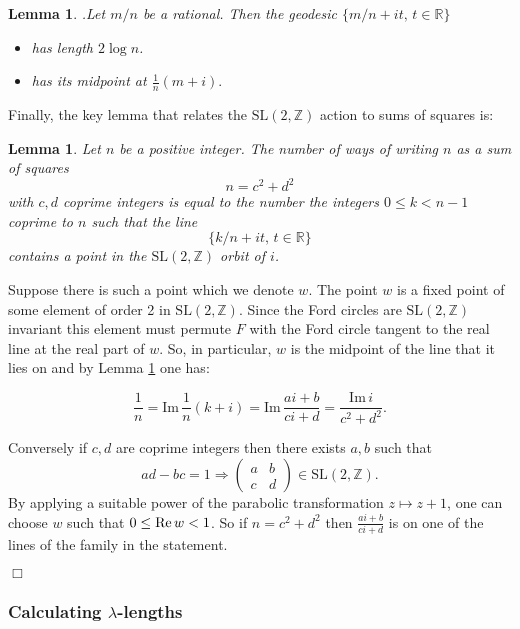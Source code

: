 \documentclass[12pt,a4paper]{amsart}
\newtheorem{lem}[thm]{Lemma}
\def\im{\mathrm{Im}\,}
\def\ZZ{\mathbb{Z}}
\def\RR{\mathbb{R}}
\def\sl2{\mathrm{SL}(2, \ZZ)}
\begin{document}
\begin{lem}.\label{calcul}
Let $m/n$ be a rational. 
Then the geodesic $\{ m/n + i t,\, t \in \RR \}$
\begin{itemize}
\item has  length $2\log n$. 
\item has its midpoint at $ \frac{1 }{n}(m + i).$
\end{itemize}
\end{lem}

Finally, the key lemma that relates the $\sl2$ action to sums of squares is:

\begin{lem} \label{squares}
Let $n$ be a positive integer.
The number of  ways of writing $n$  as a  sum of squares
$$n = c^2 + d^2$$
with $c,d$ coprime integers
is equal to the number the  integers $0 \leq k < n-1$ coprime to $n$
such that the line
$$\{  k/n + i t,\, t \in \RR \}$$
contains  a point in the $\sl2$  orbit of $i$.
\end{lem}


\proof  Suppose there is such  a point which we denote  $w$.
The point $w$ is a fixed point of some  element of order 2 in $\sl2$.
Since the Ford circles are $\sl2$ invariant
this element must permute $F$ with the Ford circle tangent 
to the real line  at the real part of $w$.
So, in particular, $w$ is the midpoint of the line 
that it lies on 
and by  Lemma \ref{calcul} one has:

$$\frac{1}{n} = \im \frac{1 }{n}(k + i)  
= \im  \frac{ai +b}{ci+d }
= \frac{\im i} {c^2 + d^2}.$$

Conversely if $c,d$ are coprime integers 
 then there exists $a,b$ such that
 $$ad - bc = 1 \Rightarrow  
 \begin{pmatrix}
 a & b \\
 c & d
 \end{pmatrix} \in \sl2.
$$
By applying a suitable power of the parabolic transformation 
$z \mapsto z + 1$,
one can choose $w$ such that $0 \leq \text{Re\,} w < 1$.
So if $n = c^2 + d^2$ then $\frac{ai +b}{ci+d }$
is on one of the lines of the family in the statement.

\hfill $\Box$

\subsubsection{Calculating $\lambda$-lengths}
\end{document}
